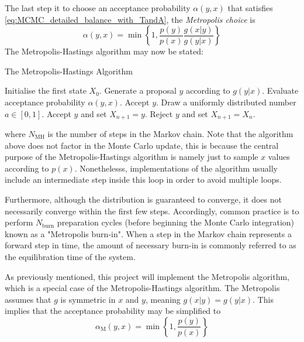 \documentclass[nofootinbib,reprint,english]{revtex4-1}
\begin{document}
The last step it to choose an acceptance probability \(\alpha(y,x)\) that satisfies \ref{eq:MCMC_detailed_balance_with_TandA}, the \emph{Metropolis choice} is
\begin{equation}\label{eq:Metropolis_Hastings_acceptance_probability}
\alpha(y,x)=\min\left\lbrace 1,\frac{p(y)}{p(x)}\frac{g(x|y)}{g(y|x)}\right\rbrace
\end{equation}
The Metropolis-Hastings algorithm may now be stated:
\begin{algorithm}[H]
\caption{The Metropolis-Hastings Algorithm}\label{algo:Metropolis_Hastings}
\begin{algorithmic}[1]
\State Initialise the first state \(X_0\).
	\State Generate a proposal \(y\) according to \(g(y|x)\).
	\State Evaluate acceptance probability \(\alpha(y,x)\).
		\State Accept \(y\).
	\Else
		\State Draw a uniformly distributed number \(a\in[0,1]\).
			\State Accept \(y\) and set \(X_{n+1}=y\).
		\Else
			\State Reject \(y\) and set \(X_{n+1}=X_n\).
		\EndIf
	\EndIf
\EndFor
\end{algorithmic}
\end{algorithm}
where \(N_\text{MH}\) is the number of steps in the Markov chain. Note that the algorithm above does not factor in the Monte Carlo update, this is because the central purpose of the Metropolis-Hastings algorithm is namely just to sample \(x\) values according to \(p(x)\). Nonethelesss, implementations of the algorithm usually include an intermediate step inside this loop in order to avoid multiple loops.

Furthermore, although the distribution is guaranteed to converge, it does not necessarily converge within the first few steps. Accordingly, common practice is to perform \(N_\text{burn}\) preparation cycles (before beginning the Monte Carlo integration) known as a "Metropolis burn-in". When a step in the Markov chain represents a forward step in time, the amount of necessary burn-in is commonly referred to as the equilibration time of the system.

As previously mentioned, this project will implement the Metropolis algorithm, which is a special case of the Metropolis-Hastings algorithm. The Metropolis assumes that \(g\) is symmetric in \(x\) and \(y\), meaning \(g(x|y)=g(y|x)\). This implies that the acceptance probability may be simplified to
\begin{equation}\label{eq:Metropolis_acceptance_probability}
\alpha_\text{M}(y,x)=\min\left\lbrace1,\frac{p(y)}{p(x)}\right\rbrace
\end{equation}
\end{document}
